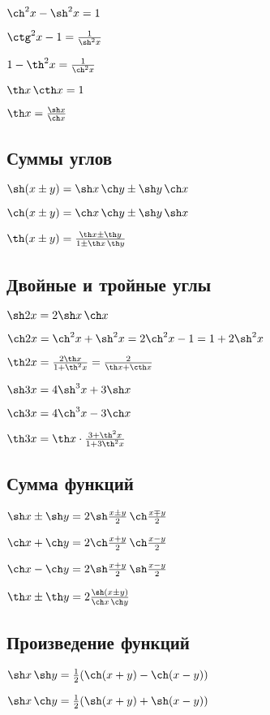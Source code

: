 $ \ch^2 x - \sh^2 x = 1 $

$ \ctg^2 x - 1 = \frac{1}{\sh^2 x} $

$ 1 - \th^2 x = \frac{1}{\ch^2 x} $

$ \th x \, \cth x = 1 $

$ \th x = \frac{\sh x}{\ch x} $

\subsection{Суммы углов}

$ \sh(x \pm y) = \sh x \, \ch y \pm \sh y \, \ch x $

$ \ch(x \pm y) = \ch x \, \ch y \pm \sh y \, \sh x $

$ \th(x \pm y) = \frac{\th x \pm \th y}{1 \pm \th x \, \th y} $

\subsection{Двойные и тройные углы}

$ \sh 2x = 2\sh x \, \ch x $

$ \ch 2x = \ch^2 x + \sh^2 x = 2\ch^2 x - 1 = 1 + 2\sh^2 x $

$ \th 2x = \frac{2\th x}{1 + \th^2 x} = \frac{2}{\th x + \cth x} $

$ \sh 3x = 4\sh^3 x + 3\sh x $

$ \ch 3x = 4\ch^3 x - 3\ch x $

$ \th 3x = \th x \cdot \frac{3+\th^2 x}{1 + 3\th^2 x} $

\subsection{Сумма функций}

$ \sh x \pm \sh y = 2\sh\frac{x\pm y}{2}\,\ch\frac{x\mp y}{2} $

$ \ch x + \ch y = 2\ch\frac{x+y}{2}\,\ch\frac{x-y}{2} $

$ \ch x - \ch y = 2\sh\frac{x+ y}{2}\,\sh\frac{x- y}{2} $

$ \th x \pm \th y = 2\frac{\sh(x\pm y)}{\ch x\, \ch y} $

\subsection{Произведение функций}

$ \sh x \, \sh y = \frac12(\ch(x+y)-\ch(x-y)) $

$ \sh x \, \ch y = \frac12(\sh(x+y)+\sh(x-y)) $

